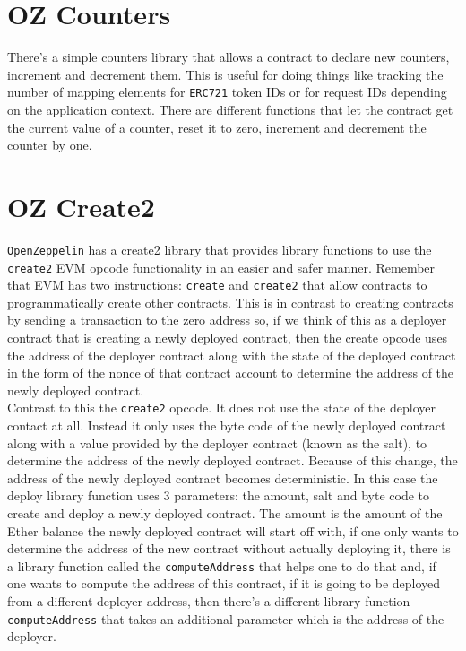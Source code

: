 \section{OZ Counters}
There's a simple counters library that allows a contract to declare new counters, increment and decrement them. This is useful for doing things like tracking the number of mapping elements for \verb|ERC721| token IDs or for request IDs depending on the application context.  There are different functions that let the contract get the current value of a counter, reset it to zero, increment and decrement the counter by one.

\section{OZ Create2}
\verb|OpenZeppelin| has a create2 library that provides library functions to use the \verb|create2| EVM opcode functionality in an easier and safer manner. Remember that EVM has two instructions: \verb|create| and \verb|create2| that allow contracts to programmatically create other contracts. This is in contrast to creating contracts by sending a transaction to the zero address so, if we think of this as a deployer contract that is creating a newly deployed contract, then the create opcode uses the address of the deployer contract along with the state of the deployed contract in the form of the nonce of that contract account to determine the address of the newly deployed contract.\\

Contrast to this the \verb|create2| opcode. It does not use the state of the deployer contact at all. Instead it only uses the byte code of the newly deployed contract along with a value provided by the deployer contract (known as the salt), to determine the address of the newly deployed contract. Because of this change, the address of the newly deployed contract becomes deterministic. In this case the deploy library function uses 3 parameters: the amount, salt and byte code to create and deploy a newly deployed contract. The amount is the amount of the Ether balance the newly deployed contract will start off with, if one only wants to determine the address of the new contract without actually deploying it, there is a library function called the \verb|computeAddress| that helps one to do that and, if one wants to compute the address of this contract, if it is going to be deployed from a different deployer address, then there's a different library function \verb|computeAddress| that takes an additional parameter which is the address of the deployer.

